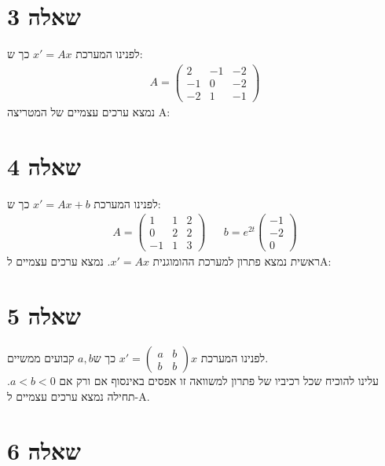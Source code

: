 \documentclass{article}
\begin{document}
\section*{שאלה 3}

לפנינו המערכת $x'=Ax$ כך ש:
\begin{align*}
    A=\begin{pmatrix}
          2  & -1 & -2 \\
          -1 & 0  & -2 \\
          -2 & 1  & -1
      \end{pmatrix}
\end{align*}
נמצא ערכים עצמיים של המטריצה A:


\pagebreak

\section*{שאלה 4}

לפנינו המערכת $x'=Ax+b$ כך ש:
\begin{align*}
    A=\begin{pmatrix}
          1  & 1 & 2 \\
          0  & 2 & 2 \\
          -1 & 1 & 3
      \end{pmatrix} &  & b=e^{2t}\begin{pmatrix}
                                     -1 \\
                                     -2 \\
                                     0
                                 \end{pmatrix}
\end{align*}
ראשית נמצא פתרון למערכת ההומוגנית $x'=Ax$. נמצא ערכים עצמיים לA:

\pagebreak

\section*{שאלה 5}

לפנינו המערכת $x'=\begin{pmatrix}
        a & b \\
        b & b
    \end{pmatrix}x$ כך ש$a,b$ קבועים ממשיים.\\
עלינו להוכיח שכל רכיביו של פתרון למשוואה זו אפסים באינסוף אם ורק אם $a<b<0$. תחילה נמצא ערכים עצמיים ל-A.

\pagebreak

\section*{שאלה 6}
\end{document}
